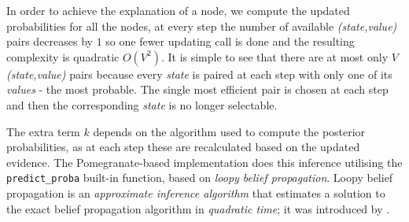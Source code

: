 In order to achieve the explanation of a node, we compute the updated probabilities for all the nodes, at every step the number of available \textit{(state,value)} pairs decreases by $1$ so one fewer updating call is done and the resulting complexity is quadratic $O(V^2)$.
It is simple to see that there are at most only $V$ \textit{(state,value)} pairs because every \textit{state} is paired at each step with only one of its \textit{values} - the most probable.
The single most efficient pair is chosen at each step and then the corresponding \textit{state} is no longer selectable.

The extra term $k$ depends on the algorithm used to compute the posterior probabilities, as at each step these are recalculated based on the updated evidence.
The Pomegranate-based implementation does this inference utilising the \texttt{predict\_proba} built-in function, based on \textit{loopy belief propagation}.
Loopy belief propagation is an \textit{approximate inference algorithm} that estimates a solution to the exact belief propagation algorithm in \textit{quadratic time}; it was introduced by \citet{pearl1982reverend}.